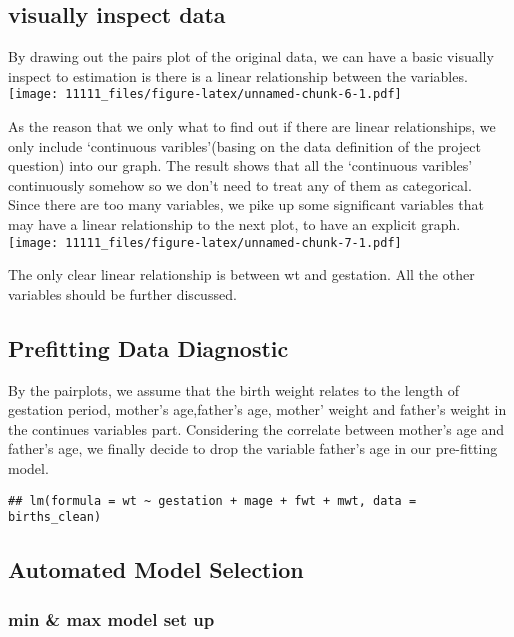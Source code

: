 \documentclass[]{article}
\begin{document}
\subsection{visually inspect data}

By drawing out the pairs plot of the original data, we can have a basic
visually inspect to estimation is there is a linear relationship between
the variables.\\
\texttt{[image: 11111\_files/figure-latex/unnamed-chunk-6-1.pdf]}

As the reason that we only what to find out if there are linear
relationships, we only include `continuous varibles'(basing on the data
definition of the project question) into our graph. The result shows
that all the `continuous varibles' continuously somehow so we don't need
to treat any of them as categorical.\\
Since there are too many variables, we pike up some significant
variables that may have a linear relationship to the next plot, to have
an explicit graph.\\
\texttt{[image: 11111\_files/figure-latex/unnamed-chunk-7-1.pdf]}

The only clear linear relationship is between wt and gestation. All the
other variables should be further discussed.

\subsection{Prefitting Data Diagnostic}

By the pairplots, we assume that the birth weight relates to the length
of gestation period, mother's age,father's age, mother' weight and
father's weight in the continues variables part. Considering the
correlate between mother's age and father's age, we finally decide to
drop the variable father's age in our pre-fitting model.

\begin{verbatim}
## lm(formula = wt ~ gestation + mage + fwt + mwt, data = births_clean)
\end{verbatim}

\subsection{Automated Model Selection}

\subsubsection{min \& max model set up}\label{min-max-model-set-up}
\end{document}
